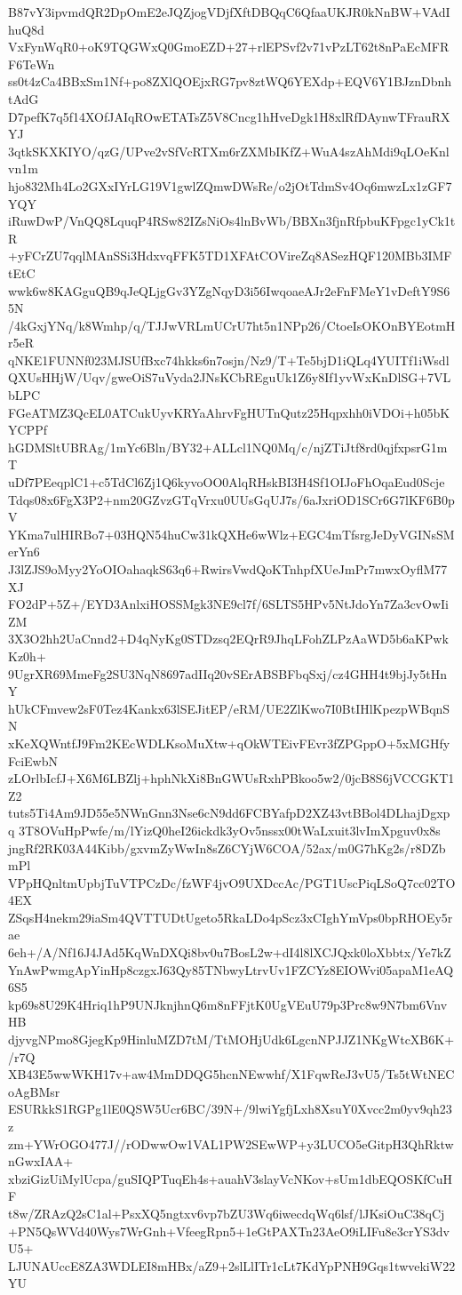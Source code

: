 B87vY3ipvmdQR2DpOmE2eJQZjogVDjfXftDBQqC6QfaaUKJR0kNnBW+VAdIhuQ8d
VxFynWqR0+oK9TQGWxQ0GmoEZD+27+rlEPSvf2v71vPzLT62t8nPaEcMFRF6TeWn
ss0t4zCa4BBxSm1Nf+po8ZXlQOEjxRG7pv8ztWQ6YEXdp+EQV6Y1BJznDbnhtAdG
D7pefK7q5f14XOfJAIqROwETATsZ5V8Cncg1hHveDgk1H8xlRfDAynwTFrauRXYJ
3qtkSKXKIYO/qzG/UPve2vSfVcRTXm6rZXMbIKfZ+WuA4szAhMdi9qLOeKnlvn1m
hjo832Mh4Lo2GXxIYrLG19V1gwlZQmwDWsRe/o2jOtTdmSv4Oq6mwzLx1zGF7YQY
iRuwDwP/VnQQ8LquqP4RSw82IZsNiOs4lnBvWb/BBXn3fjnRfpbuKFpgc1yCk1tR
+yFCrZU7qqlMAnSSi3HdxvqFFK5TD1XFAtCOVireZq8ASezHQF120MBb3IMFtEtC
wwk6w8KAGguQB9qJeQLjgGv3YZgNqyD3i56IwqoaeAJr2eFnFMeY1vDeftY9S65N
/4kGxjYNq/k8Wmhp/q/TJJwVRLmUCrU7ht5n1NPp26/CtoeIsOKOnBYEotmHr5eR
qNKE1FUNNf023MJSUfBxc74hkks6n7osjn/Nz9/T+Te5bjD1iQLq4YUITf1iWsdl
QXUsHHjW/Uqv/gweOiS7uVyda2JNsKCbREguUk1Z6y8If1yvWxKnDlSG+7VLbLPC
FGeATMZ3QcEL0ATCukUyvKRYaAhrvFgHUTnQutz25Hqpxhh0iVDOi+h05bKYCPPf
hGDMSltUBRAg/1mYc6Bln/BY32+ALLcl1NQ0Mq/c/njZTiJtf8rd0qjfxpsrG1mT
uDf7PEeqplC1+c5TdCl6Zj1Q6kyvoOO0AlqRHskBI3H4Sf1OIJoFhOqaEud0Scje
Tdqs08x6FgX3P2+nm20GZvzGTqVrxu0UUsGqUJ7s/6aJxriOD1SCr6G7lKF6B0pV
YKma7ulHIRBo7+03HQN54huCw31kQXHe6wWlz+EGC4mTfsrgJeDyVGINsSMerYn6
J3lZJS9oMyy2YoOIOahaqkS63q6+RwirsVwdQoKTnhpfXUeJmPr7mwxOyflM77XJ
FO2dP+5Z+/EYD3AnlxiHOSSMgk3NE9cl7f/6SLTS5HPv5NtJdoYn7Za3cvOwIiZM
3X3O2hh2UaCnnd2+D4qNyKg0STDzsq2EQrR9JhqLFohZLPzAaWD5b6aKPwkKz0h+
9UgrXR69MmeFg2SU3NqN8697adIIq20vSErABSBFbqSxj/cz4GHH4t9bjJy5tHnY
hUkCFmvew2sF0Tez4Kankx63lSEJitEP/eRM/UE2ZlKwo7I0BtIHlKpezpWBqnSN
xKeXQWntfJ9Fm2KEcWDLKsoMuXtw+qOkWTEivFEvr3fZPGppO+5xMGHfyFciEwbN
zLOrlbIcfJ+X6M6LBZlj+hphNkXi8BnGWUsRxhPBkoo5w2/0jcB8S6jVCCGKT1Z2
tuts5Ti4Am9JD55e5NWnGnn3Nse6cN9dd6FCBYafpD2XZ43vtBBol4DLhajDgxpq
3T8OVuHpPwfe/m/lYizQ0heI26ickdk3yOv5nssx00tWaLxuit3lvImXpguv0x8s
jngRf2RK03A44Kibb/gxvmZyWwIn8sZ6CYjW6COA/52ax/m0G7hKg2s/r8DZbmPl
VPpHQnltmUpbjTuVTPCzDc/fzWF4jvO9UXDccAc/PGT1UscPiqLSoQ7cc02TO4EX
ZSqsH4nekm29iaSm4QVTTUDtUgeto5RkaLDo4pScz3xCIghYmVps0bpRHOEy5rae
6eh+/A/Nf16J4JAd5KqWnDXQi8bv0u7BosL2w+dI4l8lXCJQxk0loXbbtx/Ye7kZ
YnAwPwmgApYinHp8czgxJ63Qy85TNbwyLtrvUv1FZCYz8EIOWvi05apaM1eAQ6S5
kp69s8U29K4Hriq1hP9UNJknjhnQ6m8nFFjtK0UgVEuU79p3Prc8w9N7bm6VnvHB
djyvgNPmo8GjegKp9HinluMZD7tM/TtMOHjUdk6LgcnNPJJZ1NKgWtcXB6K+/r7Q
XB43E5wwWKH17v+aw4MmDDQG5hcnNEwwhf/X1FqwReJ3vU5/Ts5tWtNECoAgBMsr
ESURkkS1RGPg1lE0QSW5Ucr6BC/39N+/9lwiYgfjLxh8XsuY0Xvcc2m0yv9qh23z
zm+YWrOGO477J//rODwwOw1VAL1PW2SEwWP+y3LUCO5eGitpH3QhRktwnGwxIAA+
xbziGizUiMylUcpa/guSIQPTuqEh4s+auahV3slayVcNKov+sUm1dbEQOSKfCuHF
t8w/ZRAzQ2sC1al+PsxXQ5ngtxv6vp7bZU3Wq6iwecdqWq6lsf/lJKsiOuC38qCj
+PN5QsWVd40Wys7WrGnh+VfeegRpn5+1eGtPAXTn23AeO9iLIFu8e3crYS3dvU5+
LJUNAUccE8ZA3WDLEI8mHBx/aZ9+2slLlITr1cLt7KdYpPNH9Gqs1twvekiW22YU

